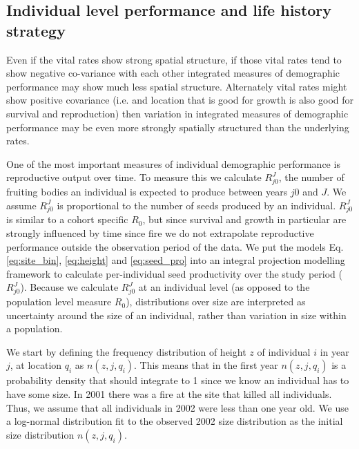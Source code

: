 \documentclass[12pt,a4paper]{article}
\begin{document}
\subsection*{Individual level performance and life history strategy}
Even if the vital rates show strong spatial structure, if those vital rates tend to show negative co-variance with each other integrated measures of demographic performance may show much less spatial structure. Alternately vital rates might show positive covariance (i.e. and location that is good for growth is also good for survival and reproduction) then variation in integrated measures of demographic performance may be even more strongly spatially structured than the underlying rates. 

One of the most important measures of individual demographic performance is reproductive output over time. To measure this we calculate $R_{j0}^J$, the number of fruiting bodies an individual is expected to produce between years $j0$ and $J$. We assume $R_{j0}^J$ is proportional to the number of seeds produced by an individual. $R_{j0}^J$ is similar to a cohort specific $R_0$, but since survival and growth in particular are strongly influenced by time since fire we do not extrapolate reproductive performance outside the observation period of the data. We put the models Eq. \ref{eq:site_bin}, \ref{eq:height} and \ref{eq:seed_pro} into an integral projection modelling framework to calculate per-individual seed productivity over the study period ($R_{j0}^J$). Because we calculate $R_{j0}^J$ at an individual level (as opposed to the population level measure $R_0$), distributions over size are interpreted as uncertainty around the size of an individual, rather than variation in size within a population.    

We start by defining the frequency distribution of height $z$ of individual $i$ in year $j$, at location $q_i$ as $n(z, j, q_i)$. This means that in the first year $n(z, j, q_i)$ is a probability density that should integrate to 1 since we know an individual has to have some size. In 2001 there was a fire at the site that killed all individuals. Thus, we assume that all individuals in 2002 were less than one year old. We use a log-normal distribution fit to the observed 2002 size distribution as the initial size distribution $n(z, j, q_i)$.   
\end{document}
